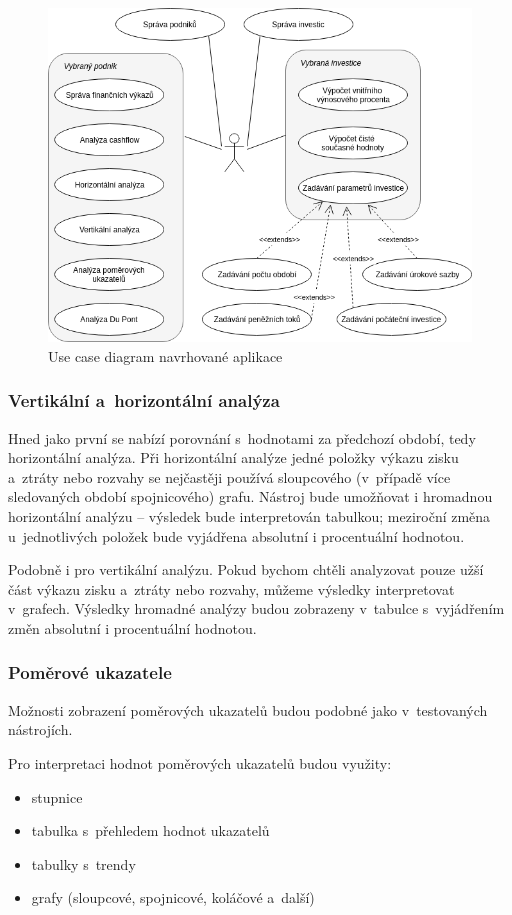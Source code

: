 \begin{figure}[!htb]
  \centering
  \includegraphics[width=14cm]{img/ucd.png}
  \caption{Use case diagram navrhované aplikace}
\end{figure}


\subsubsection{Vertikální a~horizontální analýza}
Hned jako první se nabízí porovnání s~hodnotami za předchozí období, tedy horizontální analýza. Při horizontální analýze jedné položky výkazu zisku a~ztráty nebo rozvahy se nejčastěji používá sloupcového (v~případě více sledovaných období spojnicového) grafu. Nástroj bude umožňovat i hromadnou horizontální analýzu -- výsledek bude interpretován tabulkou; meziroční změna u~jednotlivých položek bude vyjádřena absolutní i procentuální hodnotou.

Podobně i pro vertikální analýzu. Pokud bychom chtěli analyzovat pouze užší část výkazu zisku a~ztráty nebo rozvahy, můžeme výsledky interpretovat v~grafech. Výsledky hromadné analýzy budou zobrazeny v~tabulce s~vyjádřením změn absolutní i procentuální hodnotou.

\subsubsection{Poměrové ukazatele}
Možnosti zobrazení poměrových ukazatelů budou podobné jako v~testovaných nástrojích.

Pro interpretaci hodnot poměrových ukazatelů budou využity:
\begin{itemize}
	\item stupnice
	\item tabulka s~přehledem hodnot ukazatelů
	\item tabulky s~trendy
	\item grafy (sloupcové, spojnicové, koláčové a~další)
\end{itemize}

